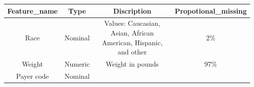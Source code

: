 \documentclass[]{article}
\begin{document}
\begin{longtable}[c]{@{}cccc@{}}
\toprule
\begin{minipage}[b]{0.20\columnwidth}\centering\strut
Feature\_name
\strut\end{minipage} &
\begin{minipage}[b]{0.09\columnwidth}\centering\strut
Type
\strut\end{minipage} &
\begin{minipage}[b]{0.35\columnwidth}\centering\strut
Discription
\strut\end{minipage} &
\begin{minipage}[b]{0.24\columnwidth}\centering\strut
Propotional\_missing
\strut\end{minipage}\tabularnewline
\midrule
\endhead
\begin{minipage}[t]{0.20\columnwidth}\centering\strut
Race
\strut\end{minipage} &
\begin{minipage}[t]{0.09\columnwidth}\centering\strut
Nominal
\strut\end{minipage} &
\begin{minipage}[t]{0.35\columnwidth}\centering\strut
Values: Caucasian, Asian, African American, Hispanic, and other
\strut\end{minipage} &
\begin{minipage}[t]{0.24\columnwidth}\centering\strut
2\%
\strut\end{minipage}\tabularnewline
\begin{minipage}[t]{0.20\columnwidth}\centering\strut
Weight
\strut\end{minipage} &
\begin{minipage}[t]{0.09\columnwidth}\centering\strut
Numeric
\strut\end{minipage} &
\begin{minipage}[t]{0.35\columnwidth}\centering\strut
Weight in pounds
\strut\end{minipage} &
\begin{minipage}[t]{0.24\columnwidth}\centering\strut
97\%
\strut\end{minipage}\tabularnewline
\begin{minipage}[t]{0.20\columnwidth}\centering\strut
Payer code
\strut\end{minipage} &
\begin{minipage}[t]{0.09\columnwidth}\centering\strut
Nominal
\strut\end{minipage} &
\begin{minipage}[t]{0.35\columnwidth}\centering\strut

\end{minipage}
\end{longtable}
\end{document}
